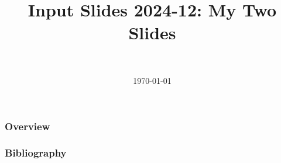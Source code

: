 \documentclass[]{beamer}
\title[Input Slides 2024-12]{Input Slides 2024-12: My Two Slides}
\author[Daniel Topa]{\TopaHII \\ \TopaHIIEmail}
\institute{\missiontech}
\date{\today}
\begin{document}
\begin{frame}
	\titlepage
\end{frame}

	

\begin{frame}\frametitle{Overview}
	\tableofcontents[hideallsubsections]
\end{frame}

	
	
	
	
	

{\tiny{
\begin{frame}[allowframebreaks]\frametitle{Bibliography}
	\printbibliography
\end{frame}}}

\begin{frame}
	\titlepage
\end{frame}
\end{document}
